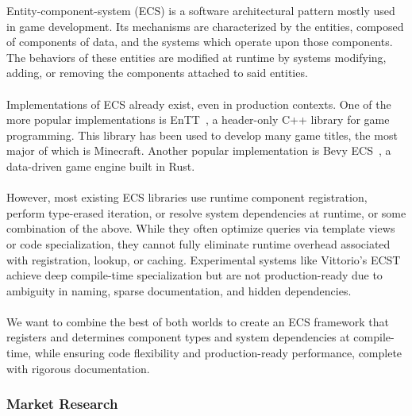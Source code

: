 Entity-component-system (ECS) is a software architectural pattern mostly used in game development.
Its mechanisms are characterized by the entities, composed of components of data,
and the systems which operate upon those components.
The behaviors of these entities are modified at runtime by systems modifying, adding, or removing the components
attached to said entities.
\\\\
Implementations of ECS already exist, even in production contexts.
One of the more popular implementations is EnTT~\cite{ValtoLibraries_EnTT}, a header-only C++ library for game programming.
This library has been used to develop many game titles, the most major of which is Minecraft.
Another popular implementation is Bevy ECS~\cite{Bevy_Engine}, a data-driven game engine built in Rust.
\\\\
However, most existing ECS libraries use runtime component registration, perform type-erased iteration, or resolve
system dependencies at runtime, or some combination of the above.
While they often optimize queries via template views or code specialization, they cannot fully eliminate
runtime overhead associated with registration, lookup, or caching.
Experimental systems like Vittorio's ECST~\cite{vittorio} achieve deep compile-time specialization
but are not production-ready due to ambiguity in naming, sparse documentation, and hidden dependencies.
\\\\
We want to combine the best of both worlds \textemdash to create an ECS framework that registers and determines component types
and system dependencies at compile-time, while ensuring code flexibility and production-ready performance, complete
with rigorous documentation.

\subsubsection*{Market Research}

